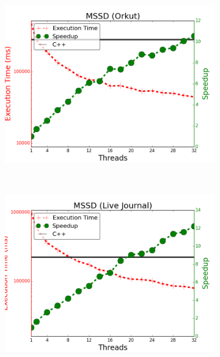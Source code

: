\begin{figure}[]
\begin{subfigure}[b]{\plotsize\textwidth}
                \label{fig:implementation:scale_sssp_uspowergrid}
        \end{subfigure}\\
        \begin{subfigure}[b]{\plotsize\textwidth}
                \includegraphics[width=\textwidth]{experiments/scalability/scale-shortest-orkut.png}
                \label{fig:implementation:scale_sssp_orkut}
        \end{subfigure}
        ~
        \begin{subfigure}[b]{\plotsize\textwidth}
                \includegraphics[width=\textwidth]{experiments/scalability/scale-shortest-livejournal.png}
                \label{fig:implementation:scale_sssp_livejournal}
        \end{subfigure}\\


\end{figure}
